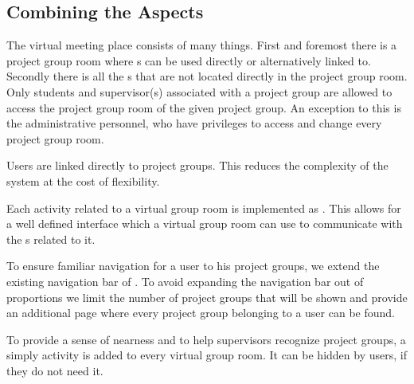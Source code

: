 \subsection{Combining the Aspects}
The virtual meeting place consists of many things.
First and foremost there is a project group room where \detdeandrelaver[]s can be used directly or alternatively linked to.
Secondly there is all the \detdeandrelaver[]s that are not located directly in the project group room.
Only students and supervisor(s) associated with a project group are allowed to access the project group room of the given project group.
An exception to this is the administrative personnel, who have privileges to access and change every project group room.

Users are linked directly to project groups.
This reduces the complexity of the system at the cost of flexibility.

Each activity related to a virtual group room is implemented as \block{}.
This allows for a well defined interface which a virtual group room can use to communicate with the \detdeandrelaver[]s related to it.

To ensure familiar navigation for a user to his project groups, we extend the existing navigation bar of \moodle{}.
To avoid expanding the navigation bar out of proportions we limit the number of project groups that will be shown and provide an additional page where every project group belonging to a user can be found.

To provide a sense of nearness and to help supervisors recognize project groups, a simply activity is added to every virtual group room.
It can be hidden by users, if they do not need it.













\FloatBarrier